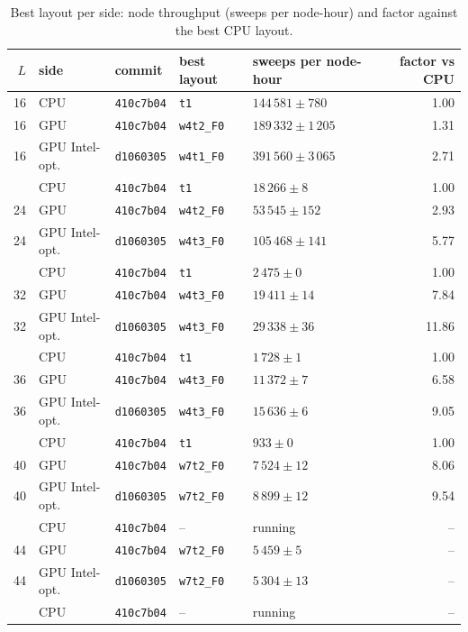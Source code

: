 \begin{table}[h]\centering\small
\caption{Best layout per side: node throughput (sweeps per node-hour) and factor against the best CPU layout.}\label{tab:summary}
\begin{tabular}{@{}rllllr@{}}\toprule
$L$ & side & commit & best layout & sweeps per node-hour & factor vs CPU\\\midrule
16 & CPU & \texttt{410c7b04} & \texttt{t1} & $144\,581 \pm 780$ & 1.00\\
16 & GPU & \texttt{410c7b04} & \texttt{w4t2\_F0} & $189\,332 \pm 1\,205$ & 1.31\\
16 & GPU Intel-opt. & \texttt{d1060305} & \texttt{w4t1\_F0} & $391\,560 \pm 3\,065$ & 2.71\\
\addlinespace
24 & CPU & \texttt{410c7b04} & \texttt{t1} & $18\,266 \pm 8$ & 1.00\\
24 & GPU & \texttt{410c7b04} & \texttt{w4t2\_F0} & $53\,545 \pm 152$ & 2.93\\
24 & GPU Intel-opt. & \texttt{d1060305} & \texttt{w4t3\_F0} & $105\,468 \pm 141$ & 5.77\\
\addlinespace
32 & CPU & \texttt{410c7b04} & \texttt{t1} & $2\,475 \pm 0$ & 1.00\\
32 & GPU & \texttt{410c7b04} & \texttt{w4t3\_F0} & $19\,411 \pm 14$ & 7.84\\
32 & GPU Intel-opt. & \texttt{d1060305} & \texttt{w4t3\_F0} & $29\,338 \pm 36$ & 11.86\\
\addlinespace
36 & CPU & \texttt{410c7b04} & \texttt{t1} & $1\,728 \pm 1$ & 1.00\\
36 & GPU & \texttt{410c7b04} & \texttt{w4t3\_F0} & $11\,372 \pm 7$ & 6.58\\
36 & GPU Intel-opt. & \texttt{d1060305} & \texttt{w4t3\_F0} & $15\,636 \pm 6$ & 9.05\\
\addlinespace
40 & CPU & \texttt{410c7b04} & \texttt{t1} & $933 \pm 0$ & 1.00\\
40 & GPU & \texttt{410c7b04} & \texttt{w7t2\_F0} & $7\,524 \pm 12$ & 8.06\\
40 & GPU Intel-opt. & \texttt{d1060305} & \texttt{w7t2\_F0} & $8\,899 \pm 12$ & 9.54\\
\addlinespace
44 & CPU & \texttt{410c7b04} & -- & running & --\\
44 & GPU & \texttt{410c7b04} & \texttt{w7t2\_F0} & $5\,459 \pm 5$ & --\\
44 & GPU Intel-opt. & \texttt{d1060305} & \texttt{w7t2\_F0} & $5\,304 \pm 13$ & --\\
\addlinespace
48 & CPU & \texttt{410c7b04} & -- & running & --\\

\end{tabular}
\end{table}
